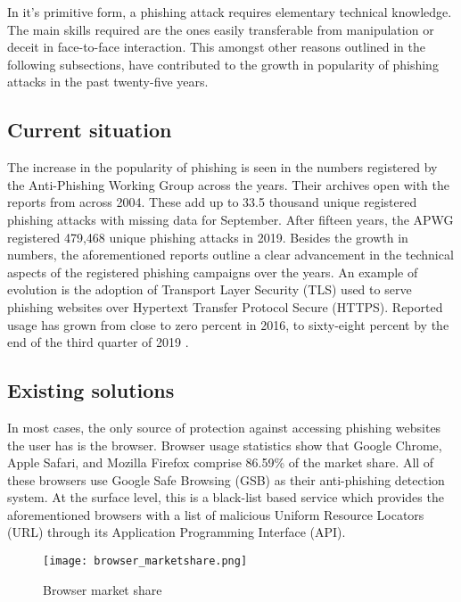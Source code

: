 In it's primitive form, a phishing attack requires elementary technical
knowledge. The main skills required are the ones easily transferable from
manipulation or deceit in face-to-face interaction. This amongst other reasons
outlined in the following subsections, have contributed to the growth in
popularity of phishing attacks in the past twenty-five years.

\subsection{Current situation}
The increase in the popularity of phishing is seen in the numbers registered by the
Anti-Phishing Working Group \citep{APWG} across the years. Their archives open
with the reports from across 2004. These add up to 33.5 thousand unique registered phishing attacks with missing data for September. After fifteen years, the \gls{APWG} registered
479,468 unique phishing attacks in 2019. Besides the growth in numbers, the
aforementioned reports outline a clear advancement in the technical aspects of
the registered phishing campaigns over the years. An example of evolution is the
adoption of Transport Layer Security (\gls{TLS}) used to serve phishing websites over
Hypertext Transfer Protocol Secure (\gls{HTTPS}). Reported usage has grown from close to zero percent in 2016, to sixty-eight percent by the end of the third quarter of 2019 \citep{APWG_Q42019}.

\subsection{Existing solutions}
In most cases, the only source of protection against accessing phishing websites
the user has is the browser. Browser usage statistics show that Google
Chrome, Apple Safari, and Mozilla Firefox comprise 86.59\% \citep{STATCOUNTER} of the market share. All of these browsers use Google Safe Browsing (\gls{GSB}) as their anti-phishing detection
system. At the surface level, this is a black-list based service which provides
the aforementioned browsers with a list of malicious Uniform Resource Locators (URL) through its
Application Programming Interface (\gls{API}).

\begin{figure}[t]
	\centering
	\texttt{[image: browser\_marketshare.png]}
	\caption{Browser market share \citep{STATCOUNTER}}
	\label{fig:BROWSER_MARKETSHARE}
\end{figure}

